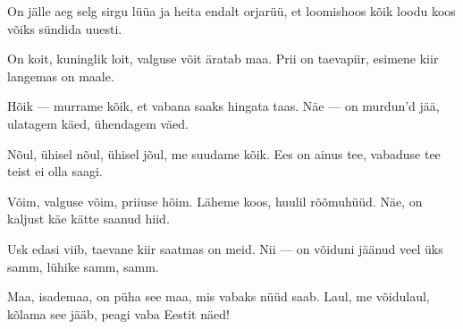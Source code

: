 On j\"alle aeg selg sirgu l\"u\"ua
ja heita endalt orjar\"u\"u,
et loomishoos k\~oik loodu
koos v\~oiks s\"undida uuesti.

On koit, kuninglik loit,
valguse v\~oit \"aratab maa.
Prii on taevapiir, esimene kiir
langemas on maale.

H\~oik --- murrame k\~oik,
et vabana saaks hingata taas.
N\"ae --- on murdun'd j\"a\"a,
ulatagem k\"aed, \"uhendagem v\"aed.

N\~oul, \"uhisel n\~oul,
\"uhisel j\~oul, me suudame k\~oik.
Ees on ainus tee, vabaduse tee
teist ei olla saagi.

V\~oim, valguse v\~oim,
priiuse h\~oim. L\"aheme koos,
huulil r\~o\~omuh\"u\"ud.
N\"ae, on kaljust k\"ae k\"atte saanud hiid.

Usk edasi viib, taevane kiir
saatmas on meid.
Nii --- on v\~oiduni j\"a\"anud veel \"uks samm,
l\"uhike samm, samm.

Maa, isademaa, on p\"uha see maa,
mis vabaks n\"u\"ud saab.
Laul, me v\~oidulaul, k\~olama see j\"a\"ab,
peagi vaba Eestit n\"aed!
